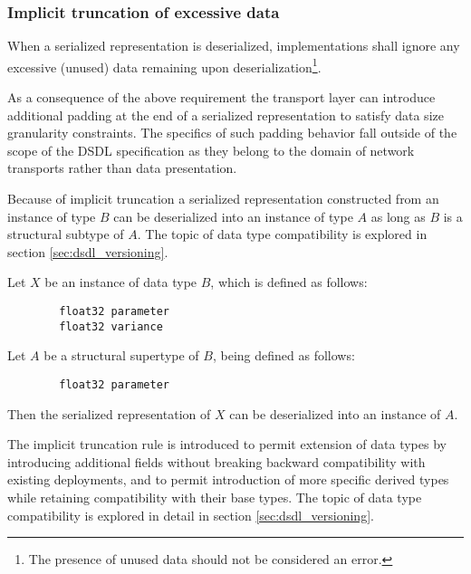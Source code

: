 \subsubsection{Implicit truncation of excessive data}

When a serialized representation is deserialized, implementations shall ignore
any excessive (unused) data remaining upon deserialization\footnote{%
    The presence of unused data should not be considered an error.
}.

\begin{remark}
    As a consequence of the above requirement the transport layer can introduce
    additional padding at the end of a serialized representation to satisfy data size granularity constraints.
    The specifics of such padding behavior fall outside of the scope of the DSDL specification
    as they belong to the domain of network transports rather than data presentation.

    Because of implicit truncation a serialized representation constructed from an instance of type $B$ can be
    deserialized into an instance of type $A$ as long as $B$ is a structural subtype of $A$.
    The topic of data type compatibility is explored in section \ref{sec:dsdl_versioning}.
\end{remark}
\begin{remark}
    Let $X$ be an instance of data type $B$, which is defined as follows:

    \begin{verbatim}
        float32 parameter
        float32 variance
    \end{verbatim}

    Let $A$ be a structural supertype of $B$, being defined as follows:

    \begin{verbatim}
        float32 parameter
    \end{verbatim}

    Then the serialized representation of $X$ can be deserialized into an instance of $A$.

    The implicit truncation rule is introduced to permit extension of data types by introducing additional fields
    without breaking backward compatibility with existing deployments,
    and to permit introduction of more specific derived types while retaining compatibility with their base types.
    The topic of data type compatibility is explored in detail in section \ref{sec:dsdl_versioning}.
\end{remark}

